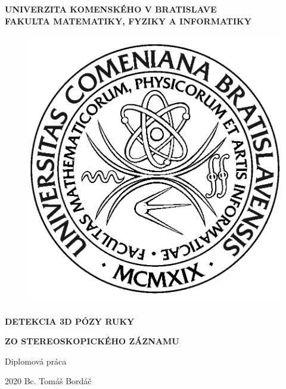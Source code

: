 \documentclass[12pt, a4paper, oneside]{book}
\newcommand\mftitleO{Detekcia 3D pózy ruky}
\newcommand\mftitleT{zo stereoskopického záznamu}
\newcommand\mfthesistype{Diplomová práca}
\newcommand\mfauthor{Bc. Tomáš Bordáč}
\newcommand\thisYear{2020}
\newcommand\mfuniversity{UNIVERZITA KOMENSKÉHO V BRATISLAVE}
\newcommand\mffaculty{FAKULTA MATEMATIKY, FYZIKY A INFORMATIKY}
\begin{document}
\frontmatter

\thispagestyle{empty}

\noindent
\begin{minipage}{\textwidth}
\begin{center}
\textbf{\mfuniversity \\
\mffaculty}
\end{center}
\end{minipage}

\vfill
\begin{figure}[!hbt]
	\begin{center}
		\includegraphics{images/logo_fmph}
		\label{img:logo}
	\end{center}
\end{figure}
\begin{center}
	\begin{minipage}{0.8\textwidth}
		\centerline{\textbf{\Large\MakeUppercase{\mftitleO}}}
		\centerline{\textbf{\Large\MakeUppercase{\mftitleT}}}
		\smallskip
		\centerline{\mfthesistype}
	\end{minipage}
\end{center}
\vfill
\thisYear \hfill
\mfauthor
\eject 

\thispagestyle{empty}
\end{document}
